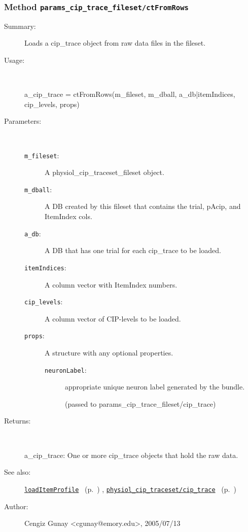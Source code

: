 \subsubsection[Method \texttt{ctFromRows}]{Method \texttt{params\_cip\_trace\_fileset/ctFromRows}}%
%
\label{ref_params_cip_trace_fileset__ctFromRows}%
\hypertarget{ref_params_cip_trace_fileset__ctFromRows}{}%
\begin{description}
\item[Summary:]Loads a cip\_trace object from raw data files in the fileset.
%
\item[Usage:]~%
\begin{lyxcode}%
a\_cip\_trace = ctFromRows(m\_fileset, m\_dball, a\_db|itemIndices, cip\_levels, props)
%
\end{lyxcode}%
%
%
\item[Parameters:]~
\begin{description}%
\item[\texttt{m\_fileset}:]
 A physiol\_cip\_traceset\_fileset object.
\item[\texttt{m\_dball}:]
 A DB created by this fileset that contains the trial, pAcip, and ItemIndex cols.
\item[\texttt{a\_db}:]
 A DB that has one trial for each cip\_trace to be loaded.
\item[\texttt{itemIndices}:]
 A column vector with ItemIndex numbers.
\item[\texttt{cip\_levels}:]
 A column vector of CIP-levels to be loaded.
\item[\texttt{props}:]
 A structure with any optional properties.
\begin{description}%
\item[\texttt{neuronLabel}:]
 appropriate unique neuron label generated by the bundle.

(passed to params\_cip\_trace\_fileset/cip\_trace)
\end{description}%
\end{description}%
%
\item[Returns:
]~

	a\_cip\_trace: One or more cip\_trace objects that hold the raw data.
%
%
\item[See also:]%
\hyperlink{ref_loadItemProfile}{\texttt{loadItemProfile}}%
\ (p.~\pageref{ref_loadItemProfile})%
%
, \hyperlink{ref_physiol_cip_traceset__cip_trace}{\texttt{physiol\_cip\_traceset/cip\_trace}}%
\ (p.~\pageref{ref_physiol_cip_traceset__cip_trace})%
%
%
\item[Author:]%
Cengiz Gunay <cgunay@emory.edu>, 2005/07/13
%
\end{description}
\methodline%
